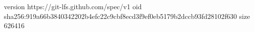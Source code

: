 version https://git-lfs.github.com/spec/v1
oid sha256:919a66b3840342202b4efc22c9cbf8ecd3f9ef0eb5179b2dccb93fd28102f630
size 626416
